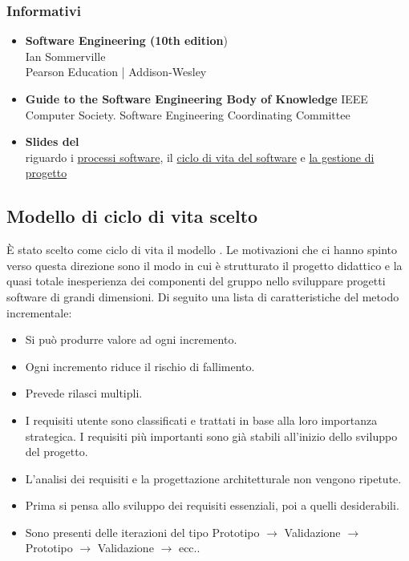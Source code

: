 		\subsubsection{Informativi}
			\begin{itemize}
				\item \textbf{Software Engineering (10th edition}) \\
				Ian Sommerville \\
				Pearson Education | Addison-Wesley
				\item \textbf{Guide to the Software Engineering Body of Knowledge}
				IEEE Computer Society. Software Engineering Coordinating Committee
				\item \textbf{Slides del \COMMITTENTE} \\ riguardo i  \href{http://www.math.unipd.it/~tullio/IS-1/2015/Dispense/L02.pdf}{processi software}, il \href{http://www.math.unipd.it/~tullio/IS-1/2015/Dispense/L03.pdf}{ciclo di vita del software} e \href{http://www.math.unipd.it/~tullio/IS-1/2015/Dispense/L04.pdf}{la gestione di progetto}	
			\end{itemize}
	\subsection{Modello di ciclo di vita scelto}
	È stato scelto come ciclo di vita il modello . Le motivazioni che ci hanno spinto verso questa direzione sono il modo in cui è strutturato il progetto didattico e la quasi totale inesperienza dei componenti del gruppo nello sviluppare progetti software di grandi dimensioni. Di seguito una lista di caratteristiche del metodo incrementale:
	\begin{itemize}
		\item Si può produrre valore ad ogni incremento.
		\item Ogni incremento riduce il rischio di fallimento.
		\item Prevede rilasci multipli.
		\item I requisiti utente sono classificati e trattati in base alla loro importanza strategica. I requisiti più importanti sono già stabili all'inizio dello sviluppo del progetto.
		\item L'analisi dei requisiti e la progettazione architetturale non vengono ripetute.
		\item Prima si pensa allo sviluppo dei requisiti essenziali, poi a quelli desiderabili.
		\item Sono presenti delle iterazioni del tipo Prototipo $\rightarrow$ Validazione $\rightarrow$ Prototipo $\rightarrow$ Validazione $\rightarrow$ ecc..
	\end{itemize}
